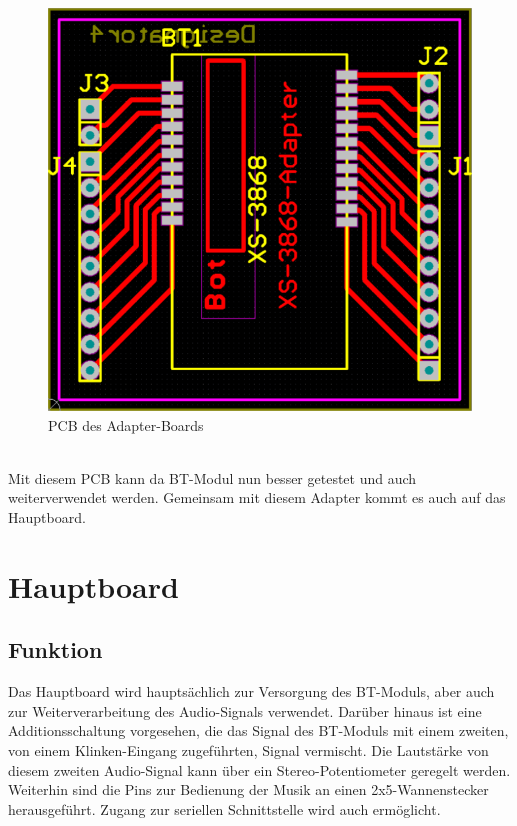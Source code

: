 \begin{figure} [h]
	\centering
	\caption{PCB des Adapter-Boards}
	\label {fig:abb3.2}
	\includegraphics[width=1\textwidth]{schaltungen/adapter_pcb.png}
\end{figure} \\
Mit diesem PCB kann da BT-Modul nun besser getestet und auch weiterverwendet werden. Gemeinsam mit diesem Adapter kommt es auch auf das Hauptboard.
\newpage


\section{Hauptboard}
\subsection{Funktion}
Das Hauptboard wird hauptsächlich zur Versorgung des BT-Moduls, aber auch zur Weiterverarbeitung des Audio-Signals verwendet. Darüber hinaus ist eine Additionsschaltung vorgesehen, die das Signal des BT-Moduls mit einem zweiten, von einem Klinken-Eingang zugeführten, Signal vermischt. Die Lautstärke von diesem zweiten Audio-Signal kann über ein Stereo-Potentiometer geregelt werden. \\
Weiterhin sind die Pins zur Bedienung der Musik an einen 2x5-Wannenstecker herausgeführt. Zugang zur seriellen Schnittstelle wird auch ermöglicht.

